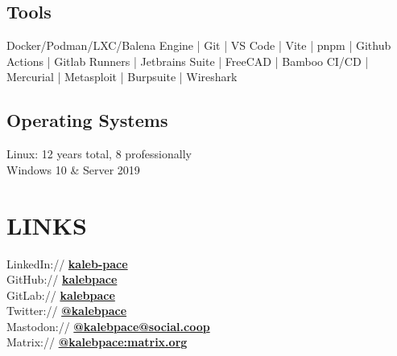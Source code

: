 \documentclass{deedy-resume-openfont}
\begin{document}
\begin{minipage}[t]{0.35\textwidth}
	\subsection{Tools}
	Docker/Podman/LXC/Balena Engine | 
	Git | 
	VS Code | 
	Vite | 
	pnpm | 
	Github Actions | 
	Gitlab Runners | 
	Jetbrains Suite | 
	FreeCAD | 
	Bamboo CI/CD | 
	Mercurial | 
	Metasploit | 
	Burpsuite | 
	Wireshark
	\sectionsep
	\sectionsep
																																																																		
	\subsection{Operating Systems}
	\textbullet{} Linux: 12 years total, 8 professionally\\
	\textbullet{} Windows 10 \& Server 2019
	\sectionsep
	\sectionsep
																																																																		
	\section{LINKS} 
	LinkedIn:// \href{https://www.linkedin.com/in/kaleb-pace}{\bf kaleb-pace} \\
	GitHub:// \href{https://github.com/kalebpace}{\bf kalebpace} \\
	GitLab:// \href{https://gitlab.com/kalebpace}{\bf kalebpace} \\
	Twitter:// \href{https://twitter.com/kalebpace}{\bf @kalebpace} \\
	Mastodon:// \href{https://social.coop/web/kalebpace}{\bf @kalebpace@social.coop} \\
	Matrix:// \href{https://matrix.to/#/@kalebpace:matrix.org}{\bf @kalebpace:matrix.org} \\
																																																																		
\end{minipage} 
\end{document}
